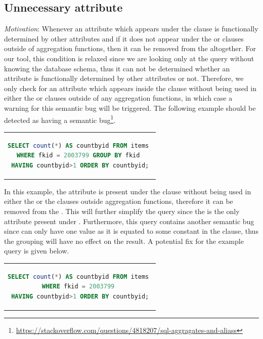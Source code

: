 \subsection{Unnecessary  attribute}
\emph{Motivation}: Whenever an attribute which appears under the  clause is functionally determined by other attributes and if it does not appear under the  or  clauses outside of aggregation functions, then it can be removed from the  altogether. For our tool, this condition is relaxed since we are looking only at the query without knowing the database schema, thus it can not be determined whether an attribute is functionally determined by other attributes or not. Therefore, we only check for an attribute which appears inside the  clause without being used in either the  or  clauses outside of any aggregation functions, in which case a warning for this semantic bug will be triggered. The following example should be detected as having a semantic bug\footnote{\url{https://stackoverflow.com/questions/4818207/sql-aggragates-and-aliass}}.

\begin{center}
\begin{tabular}{c}
\begin{lstlisting}[language=SQL]
SELECT count(*) AS countbyid FROM items 
WHERE fkid = 2003799 GROUP BY fkid 
HAVING countbyid>1 ORDER BY countbyid;
\end{lstlisting}
\end{tabular}
\end{center}

In this example, the  attribute is present under the  clause without being used in either the  or the  clauses outside aggregation functions, therefore it can be removed from the . This will further simplify the query since the  is the only attribute present under . Furthermore, this query contains another semantic bug since  can only have one value as it is equated to some constant in the  clause, thus the grouping will have no effect on the result. A potential fix for the example query is given below.

\begin{center}
\begin{tabular}{c}
\begin{lstlisting}[language=SQL]
SELECT count(*) AS countbyid FROM items 
WHERE fkid = 2003799 
HAVING countbyid>1 ORDER BY countbyid;
\end{lstlisting}
\end{tabular}
\end{center}


